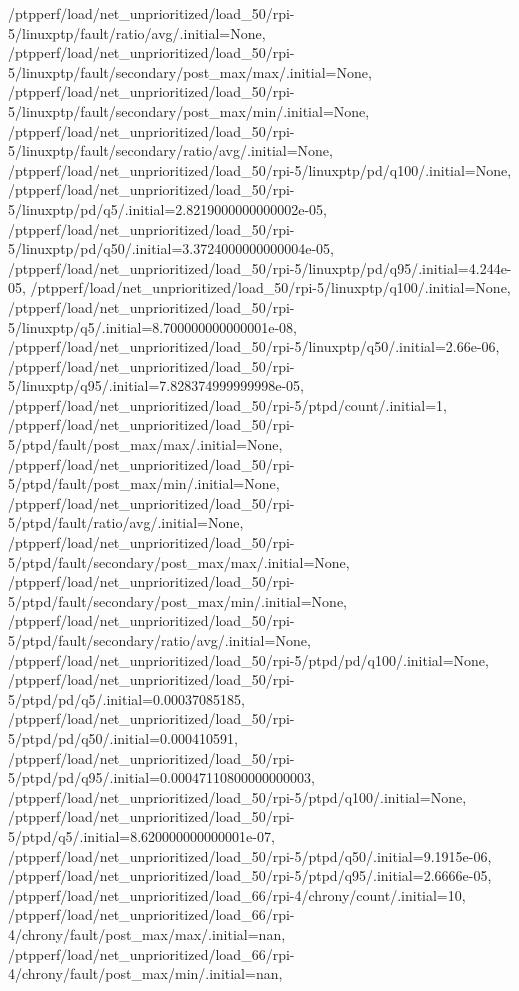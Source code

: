 {    /ptpperf/load/net_unprioritized/load_50/rpi-5/linuxptp/fault/ratio/avg/.initial=None,
    /ptpperf/load/net_unprioritized/load_50/rpi-5/linuxptp/fault/secondary/post_max/max/.initial=None,
    /ptpperf/load/net_unprioritized/load_50/rpi-5/linuxptp/fault/secondary/post_max/min/.initial=None,
    /ptpperf/load/net_unprioritized/load_50/rpi-5/linuxptp/fault/secondary/ratio/avg/.initial=None,
    /ptpperf/load/net_unprioritized/load_50/rpi-5/linuxptp/pd/q100/.initial=None,
    /ptpperf/load/net_unprioritized/load_50/rpi-5/linuxptp/pd/q5/.initial=2.8219000000000002e-05,
    /ptpperf/load/net_unprioritized/load_50/rpi-5/linuxptp/pd/q50/.initial=3.3724000000000004e-05,
    /ptpperf/load/net_unprioritized/load_50/rpi-5/linuxptp/pd/q95/.initial=4.244e-05,
    /ptpperf/load/net_unprioritized/load_50/rpi-5/linuxptp/q100/.initial=None,
    /ptpperf/load/net_unprioritized/load_50/rpi-5/linuxptp/q5/.initial=8.700000000000001e-08,
    /ptpperf/load/net_unprioritized/load_50/rpi-5/linuxptp/q50/.initial=2.66e-06,
    /ptpperf/load/net_unprioritized/load_50/rpi-5/linuxptp/q95/.initial=7.828374999999998e-05,
    /ptpperf/load/net_unprioritized/load_50/rpi-5/ptpd/count/.initial=1,
    /ptpperf/load/net_unprioritized/load_50/rpi-5/ptpd/fault/post_max/max/.initial=None,
    /ptpperf/load/net_unprioritized/load_50/rpi-5/ptpd/fault/post_max/min/.initial=None,
    /ptpperf/load/net_unprioritized/load_50/rpi-5/ptpd/fault/ratio/avg/.initial=None,
    /ptpperf/load/net_unprioritized/load_50/rpi-5/ptpd/fault/secondary/post_max/max/.initial=None,
    /ptpperf/load/net_unprioritized/load_50/rpi-5/ptpd/fault/secondary/post_max/min/.initial=None,
    /ptpperf/load/net_unprioritized/load_50/rpi-5/ptpd/fault/secondary/ratio/avg/.initial=None,
    /ptpperf/load/net_unprioritized/load_50/rpi-5/ptpd/pd/q100/.initial=None,
    /ptpperf/load/net_unprioritized/load_50/rpi-5/ptpd/pd/q5/.initial=0.00037085185,
    /ptpperf/load/net_unprioritized/load_50/rpi-5/ptpd/pd/q50/.initial=0.000410591,
    /ptpperf/load/net_unprioritized/load_50/rpi-5/ptpd/pd/q95/.initial=0.00047110800000000003,
    /ptpperf/load/net_unprioritized/load_50/rpi-5/ptpd/q100/.initial=None,
    /ptpperf/load/net_unprioritized/load_50/rpi-5/ptpd/q5/.initial=8.620000000000001e-07,
    /ptpperf/load/net_unprioritized/load_50/rpi-5/ptpd/q50/.initial=9.1915e-06,
    /ptpperf/load/net_unprioritized/load_50/rpi-5/ptpd/q95/.initial=2.6666e-05,
    /ptpperf/load/net_unprioritized/load_66/rpi-4/chrony/count/.initial=10,
    /ptpperf/load/net_unprioritized/load_66/rpi-4/chrony/fault/post_max/max/.initial=nan,
    /ptpperf/load/net_unprioritized/load_66/rpi-4/chrony/fault/post_max/min/.initial=nan,
}
